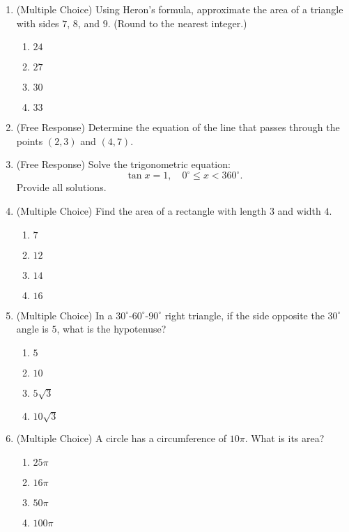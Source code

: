 \documentclass[12pt]{article}
\begin{document}
\begin{enumerate}[label=\textbf{Question \arabic*:}]
  \item (Multiple Choice) Using Heron’s formula, approximate the area of a triangle with sides \(7\), \(8\), and \(9\). (Round to the nearest integer.)
    \begin{enumerate}[label=(\Alph*)]
      \item \(24\)
      \item \(27\)
      \item \(30\)
      \item \(33\)
    \end{enumerate}
    
  \item (Free Response) Determine the equation of the line that passes through the points \((2,3)\) and \((4,7)\).
    
  \item (Free Response) Solve the trigonometric equation:
    \[
    \tan x = 1, \quad 0^\circ \le x < 360^\circ.
    \]
    Provide all solutions.

\item (Multiple Choice) Find the area of a rectangle with length \(3\) and width \(4\).
    \begin{enumerate}[label=(\Alph*)]
      \item \(7\)
      \item \(12\)
      \item \(14\)
      \item \(16\)
    \end{enumerate}
    
  \item (Multiple Choice) In a \(30^\circ\text{-}60^\circ\text{-}90^\circ\) right triangle, if the side opposite the \(30^\circ\) angle is \(5\), what is the hypotenuse?
    \begin{enumerate}[label=(\Alph*)]
      \item \(5\)
      \item \(10\)
      \item \(5\sqrt{3}\)
      \item \(10\sqrt{3}\)
    \end{enumerate}
    
  \item (Multiple Choice) A circle has a circumference of \(10\pi\). What is its area?
    \begin{enumerate}[label=(\Alph*)]
      \item \(25\pi\)
      \item \(16\pi\)
      \item \(50\pi\)
      \item \(100\pi\)
    \end{enumerate}
    

\end{enumerate}
\end{document}
